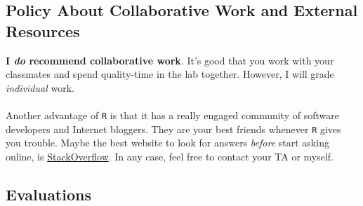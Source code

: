 \documentclass[letterpaper]{article}
\begin{document}
\subsection*{Policy About Collaborative Work and External Resources}

{\bf I \emph{do} recommend collaborative work}. It's good that you work with your classmates and spend quality-time in the lab together. However, I will grade \emph{individual} work. 
\\
\\
Another advantage of \texttt{R} is that it has a really engaged community of software developers and Internet bloggers. They are your best friends whenever \texttt{R} gives you trouble. Maybe the best website to look for answers \emph{before} start asking online, is \href{https://stackoverflow.com/questions/tagged/r}{StackOverflow}. In any case, feel free to contact your TA or myself.

\subsection*{Evaluations}
\end{document}
